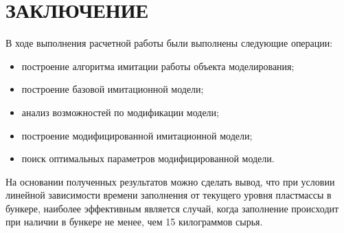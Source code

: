 \section*{ЗАКЛЮЧЕНИЕ}

В ходе выполнения расчетной работы были выполнены следующие операции:

\begin{itemize}
\item построение алгоритма имитации работы объекта моделирования;
\item построение базовой имитационной модели;
\item анализ возможностей по модификации модели;
\item построение модифицированной имитационной модели;
\item поиск оптимальных параметров модифицированной модели.
\end{itemize}

На основании полученных результатов можно сделать вывод, 
что при условии линейной зависимости времени заполнения от текущего 
уровня пластмассы в бункере, наиболее эффективным является случай, 
когда заполнение происходит при наличии в бункере не менее,
чем 15 килограммов сырья.

